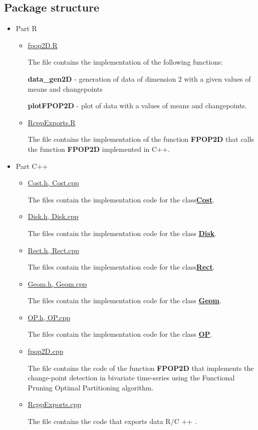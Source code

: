 \documentclass{report}
\begin{document}
	\subsection*{Package structure}
	\begin{itemize}
		\item  Part R
		\begin{itemize}
			\item \underline {fpop2D.R}
			
			The file contains the implementation of the following functions:
			
			 {\bfseries data\_gen2D} - generation of data of dimension 2 with a given values of means and changepoints
			 
			 {\bfseries plotFPOP2D} - plot of data with a  values of means and changepoints.
			 
			\item \underline {RcppExports.R} 
			
			The file contains the implementation of the function {\bfseries FPOP2D} that calls the function {\bfseries FPOP2D} implemented in C++.
			
		\end{itemize}
		\item Part C++
		\begin{itemize}
			\item \underline {Cost.h, Cost.cpp} 
			
			The files contain the implementation code for the class\hyperref [Cost]{\bfseries Cost}. 	
			
			\item \underline{Disk.h, Disk.cpp}
			
			The files contain the implementation code for the class \hyperref [Disk]{\bfseries Disk}. 
			
			\item  \underline{Rect.h, Rect.cpp}
			
			The files contain the implementation code for the class\hyperref [Rect] {\bfseries Rect}.
			 
			\item \underline{Geom.h, Geom.cpp} 
			
			The files contain the implementation code for the class \hyperref [Geom]{\bfseries Geom}. 
			
			\item \underline{OP.h, OP.cpp}
			
			The files contain the implementation code for the class \hyperref [OP]{\bfseries OP}. 
			
			\item \underline{fpop2D.cpp}
			
			The file contains the code of the function {\bfseries FPOP2D} that implements the change-point detection in bivariate time-series using the Functional Pruning Optimal Partitioning algorithm.
			
			\item \underline{RcppExports.cpp} 
			
			The file contains the code that exports data R/C ++ .	
		\end{itemize}
	\end{itemize}
\end{document}
